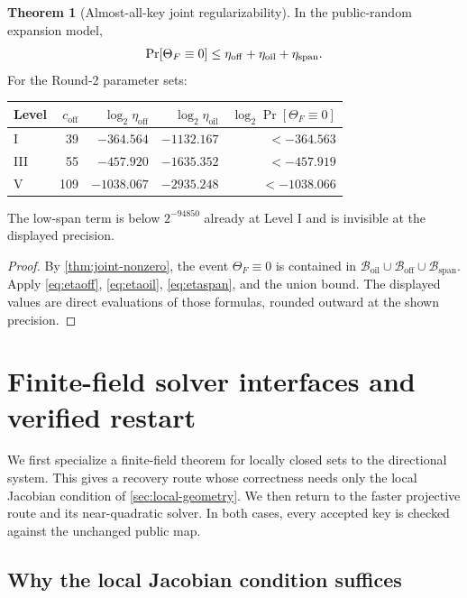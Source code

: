 \documentclass[11pt,a4paper]{article}
\theoremstyle{definition}
\newtheorem{theorem}{Theorem}[section]
\theoremstyle{remark}
\newcommand{\cB}{\mathcal B}
\newcommand{\oil}{\mathrm{oil}}
\newcommand{\off}{\mathrm{off}}
\newcommand{\spanbad}{\mathrm{span}}
\begin{document}
\begin{theorem}[Almost-all-key joint regularizability]\label{thm:key-density}
In the public-random expansion model,
\begin{equation}\label{eq:keybad-total}
\Pr[\Theta_F\equiv0]
\le\eta_{\off}+\eta_{\oil}+\eta_{\rm span}.
\end{equation}
For the Round-2 parameter sets:
\begin{center}
\begin{tabular}{@{}lrrrr@{}}
\toprule
Level & $c_{\off}$ & $\log_2\eta_{\off}$ & $\log_2\eta_{\oil}$ & $\log_2\Pr[\Theta_F\equiv0]$\\
\midrule
I   & 39  & $-364.564$  & $-1132.167$ & $<-364.563$\\
III & 55  & $-457.920$  & $-1635.352$ & $<-457.919$\\
V   & 109 & $-1038.067$ & $-2935.248$ & $<-1038.066$\\
\bottomrule
\end{tabular}
\end{center}
The low-span term is below $2^{-94850}$ already at Level I and is invisible at the displayed precision.
\end{theorem}

\begin{proof}
By \cref{thm:joint-nonzero}, the event $\Theta_F\equiv0$ is contained in $\cB_{\oil}\cup\cB_{\off}\cup\cB_{\spanbad}$.  Apply \eqref{eq:etaoff}, \eqref{eq:etaoil}, \eqref{eq:etaspan}, and the union bound.  The displayed values are direct evaluations of those formulas, rounded outward at the shown precision.
\end{proof}

\section{Finite-field solver interfaces and verified restart}\label{sec:solver-attack}

We first specialize a finite-field theorem for locally closed sets to the
directional system.  This gives a recovery route whose correctness needs only
the local Jacobian condition of \cref{sec:local-geometry}.  We then return to
the faster projective route and its near-quadratic solver.  In both cases,
every accepted key is checked against the unchanged public map.

\subsection{Why the local Jacobian condition suffices}\label{subsec:localization-proof}
\end{document}
